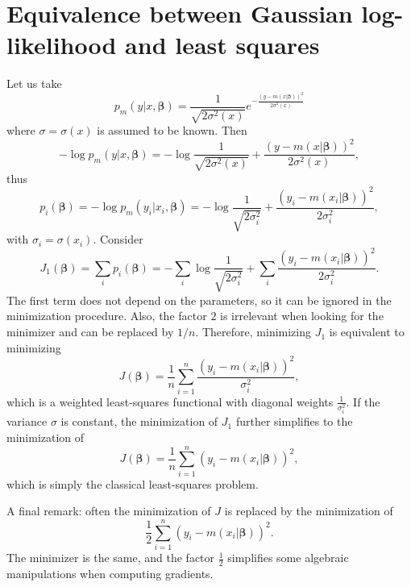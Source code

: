 \documentclass{article}
\begin{document}
\section{Equivalence between Gaussian log-likelihood and least squares}
\label{sec:logequivalence}
Let us take
\[
  p_m(y|x,\boldsymbol{\beta})=\frac{1}{\sqrt{2\sigma^2(x)}}e^{-\frac{(y-m(x|\boldsymbol{\beta}))^2}{2\sigma^2(x)}}
\]
where $\sigma=\sigma(x)$ is assumed to be known. Then
\[
  -\log p_m(y|x,\boldsymbol{\beta})=-\log{\frac{1}{\sqrt{2\sigma^2(x)}}}+\frac{(y-m(x|\boldsymbol{\beta}))^2}{2\sigma^2(x)},
\]
thus
\[
  p_i(\boldsymbol{\beta})=-\log p_m(y_i|x_i,\boldsymbol{\beta})=-\log{\frac{1}{\sqrt{2\sigma^2_i}}}+\frac{(y_i-m(x_i|\boldsymbol{\beta}))^2}{2\sigma^2_i},
\]
with $\sigma_i=\sigma(x_i)$. Consider
\[
  J_1(\boldsymbol{\beta})=\sum_i p_i(\boldsymbol{\beta})=
  -\sum_i \log{\frac{1}{\sqrt{2\sigma^2_i}}}
  +\sum_i \frac{(y_i-m(x_i|\boldsymbol{\beta}))^2}{2\sigma^2_i}.
\]
The first term does not depend on the parameters, so it can be ignored in the minimization procedure. Also, the factor $2$ is irrelevant when looking for the minimizer and can be replaced by $1/n$. Therefore, minimizing $J_1$ is equivalent to minimizing
\[
  J(\boldsymbol{\beta})=\frac{1}{n}\sum_{i=1}^n \frac{(y_i-m(x_i|\boldsymbol{\beta}))^2}{\sigma^2_i},
\]
which is a weighted least-squares functional with diagonal weights $\frac{1}{\sigma_i^2}$. If the variance $\sigma$ is constant, the minimization of $J_1$ further simplifies to the minimization of
\[
  J(\boldsymbol{\beta})=\frac{1}{n}\sum_{i=1}^n (y_i-m(x_i|\boldsymbol{\beta}))^2,
\]
which is simply the classical least-squares problem.

A final remark: often the minimization of $J$ is replaced by the minimization of
\[
  \frac{1}{2}\sum_{i=1}^n (y_i-m(x_i|\boldsymbol{\beta}))^2.
\]
The minimizer is the same, and the factor $\frac{1}{2}$ simplifies some algebraic manipulations when computing gradients.
\end{document}

